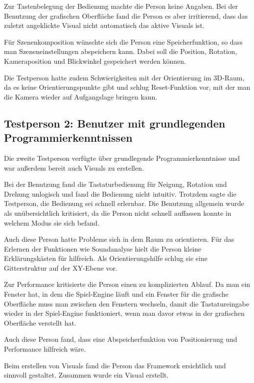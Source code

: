 Zur Tastenbelegung der Bedienung machte die Person keine Angaben. Bei der Benutzung der grafischen Oberfl\"ache fand die
Person es aber irritierend, dass das zuletzt angeklickte Visual nicht automatisch das aktive Visuals ist.

F\"ur Szenenkomposition w\"unschte sich die Person eine Speicherfunktion, so dass man Szeneneinstellungen abspeichern kann.
Dabei soll die Position, Rotation, Kameraposition und Blickwinkel gespeichert werden k\"onnen.

Die Testperson hatte zudem Schwierigkeiten mit der Orientierung im 3D-Raum, da es keine Orientierungspunkte gibt und
schlug Reset-Funktion vor, mit der man die Kamera wieder auf Aufgangslage bringen kann.

\subsection{Testperson 2: Benutzer mit grundlegenden Programmierkenntnissen}

Die zweite Testperson verf\"ugte \"uber grundlegende Programmierkenntnisse und war au\ss{}erdem bereit auch Visuals zu
erstellen.

Bei der Benutzung fand die Tastaturbedienung f\"ur Neigung, Rotation und Drehung unlogisch und fand die Bedienung
nicht intuitiv. Trotzdem sagte die Testperson, die Bedienung sei schnell erlernbar. Die Benutzung allgemein wurde
als un\"ubersichtlich kritisiert, da die Person nicht schnell auffassen konnte in welchem Modus sie sich befand.

Auch diese Person hatte Probleme sich in dem Raum zu orientieren. F\"ur das Erlernen der Funktionen wie Soundanalyse
hielt die Person kleine Erkl\"arungsk\"asten f\"ur hilfreich. Als Orientierungshilfe schlug sie eine Gitterstruktur auf
der XY-Ebene vor.

Zur Performance kritisierte die Person einen zu komplizierten Ablauf. Da man ein Fenster hat, in dem die Spiel-Engine
l\"auft und ein Fenster f\"ur die grafische Oberfl\"ache muss man zwischen den Fenstern wechseln, damit die Tastatureingabe
wieder in der Spiel-Engine funktioniert, wenn man davor etwas in der grafischen Oberfl\"ache verstellt hat.

Auch diese Person fand, dass eine Abspeicherfunktion von Positionierung und Performance hilfreich w\"are.

Beim erstellen von Visuals fand die Person das Framework ersichtlich und sinnvoll gestaltet. Zusammen wurde ein Visual
erstellt.

